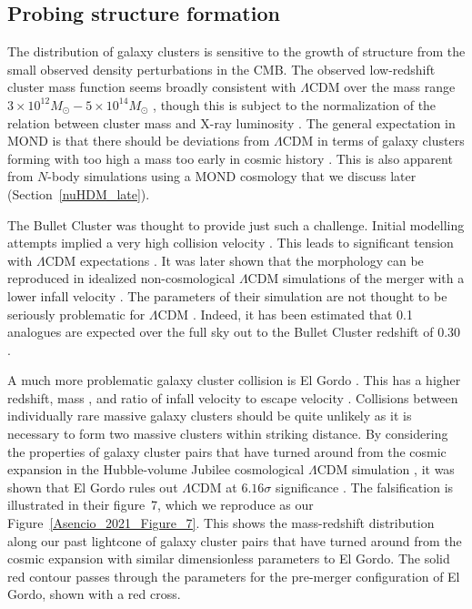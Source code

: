 \documentclass[fleqn,usenatbib,useAMS,onecolumn]{mnras} %
\begin{document}
\subsection{Probing structure formation}
\label{Galaxy_clusters_formation}

The distribution of galaxy clusters is sensitive to the growth of structure from the small observed density perturbations in the CMB. The observed low-redshift cluster mass function seems broadly consistent with $\Lambda$CDM over the mass range $3 \times 10^{12} M_\odot - 5 \times 10^{14} M_\odot$ \citep{Bohringer_2017}, though this is subject to the normalization of the relation between cluster mass and X-ray luminosity \citep{Bohringer_2014, Schrabback_2021_calibration}. The general expectation in MOND is that there should be deviations from $\Lambda$CDM in terms of galaxy clusters forming with too high a mass too early in cosmic history \citep{Sanders_2001}. This is also apparent from $N$-body simulations \citep{Angus_2013, Katz_2013} using a MOND cosmology that we discuss later (Section~\ref{nuHDM_late}).

The Bullet Cluster was thought to provide just such a challenge. Initial modelling attempts implied a very high collision velocity \citep{Milosavljevic_2007, Springel_2007, Mastropietro_2008}. This leads to significant tension with $\Lambda$CDM expectations \citep{Lee_2010, Thompson_Nagamine_2012}. It was later shown that the morphology can be reproduced in idealized non-cosmological $\Lambda$CDM simulations of the merger with a lower infall velocity \citep{Lage_Farrar_2014}. The parameters of their simulation are not thought to be seriously problematic for $\Lambda$CDM \citep{Watson_2014, Thompson_2015}. Indeed, it has been estimated that 0.1 analogues are expected over the full sky out to the Bullet Cluster redshift of 0.30 \citep{Kraljic_2015}.

A much more problematic galaxy cluster collision is El Gordo \citep{Menanteau_2010, Menanteau_2012}. This has a higher redshift, mass \citep{Jee_2014}, and ratio of infall velocity to escape velocity \citep{Molnar_2015, Ng_2015, Zhang_2015}. Collisions between individually rare massive galaxy clusters should be quite unlikely as it is necessary to form two massive clusters within striking distance. By considering the properties of galaxy cluster pairs that have turned around from the cosmic expansion in the Hubble-volume Jubilee cosmological $\Lambda$CDM simulation \citep{Watson_2013}, it was shown that El Gordo rules out $\Lambda$CDM at $6.16\sigma$ significance \citep*{Asencio_2021}. The falsification is illustrated in their figure~7, which we reproduce as our Figure~\ref{Asencio_2021_Figure_7}. This shows the mass-redshift distribution along our past lightcone of galaxy cluster pairs that have turned around from the cosmic expansion with similar dimensionless parameters to El Gordo. The solid red contour passes through the parameters for the pre-merger configuration of El Gordo, shown with a red cross.
\end{document}
